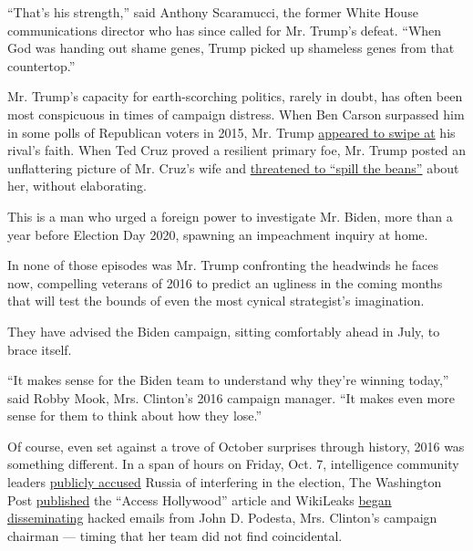 ``That's his strength,'' said Anthony Scaramucci, the former White House
communications director who has since called for Mr. Trump's defeat.
``When God was handing out shame genes, Trump picked up shameless genes
from that countertop.''

Mr. Trump's capacity for earth-scorching politics, rarely in doubt, has
often been most conspicuous in times of campaign distress. When Ben
Carson surpassed him in some polls of Republican voters in 2015, Mr.
Trump
\href{https://www.nytimes.com/politics/first-draft/2015/10/25/donald-trump-attacks-ben-carson-and-highlights-his-religion}{appeared
to swipe at} his rival's faith. When Ted Cruz proved a resilient primary
foe, Mr. Trump posted an unflattering picture of Mr. Cruz's wife and
\href{https://www.nytimes.com/politics/first-draft/2016/03/23/donald-trump-threatens-ted-cruzs-wife-elicting-angry-retort/}{threatened
to ``spill the beans''} about her, without elaborating.

This is a man who urged a foreign power to investigate Mr. Biden, more
than a year before Election Day 2020, spawning an impeachment inquiry at
home.

In none of those episodes was Mr. Trump confronting the headwinds he
faces now, compelling veterans of 2016 to predict an ugliness in the
coming months that will test the bounds of even the most cynical
strategist's imagination.

They have advised the Biden campaign, sitting comfortably ahead in July,
to brace itself.

``It makes sense for the Biden team to understand why they're winning
today,'' said Robby Mook, Mrs. Clinton's 2016 campaign manager. ``It
makes even more sense for them to think about how they lose.''

Of course, even set against a trove of October surprises through
history, 2016 was something different. In a span of hours on Friday,
Oct. 7, intelligence community leaders
\href{https://www.dhs.gov/news/2016/10/07/joint-statement-department-homeland-security-and-office-director-national}{publicly
accused} Russia of interfering in the election, The Washington Post
\href{https://www.washingtonpost.com/politics/trump-recorded-having-extremely-lewd-conversation-about-women-in-2005/2016/10/07/3b9ce776-8cb4-11e6-bf8a-3d26847eeed4_story.html}{published}
the ``Access Hollywood'' article and WikiLeaks
\href{https://www.nytimes.com/2016/10/12/us/politics/hillary-clinton-emails-wikileaks.html}{began
disseminating} hacked emails from John D. Podesta, Mrs. Clinton's
campaign chairman --- timing that her team did not find coincidental.


